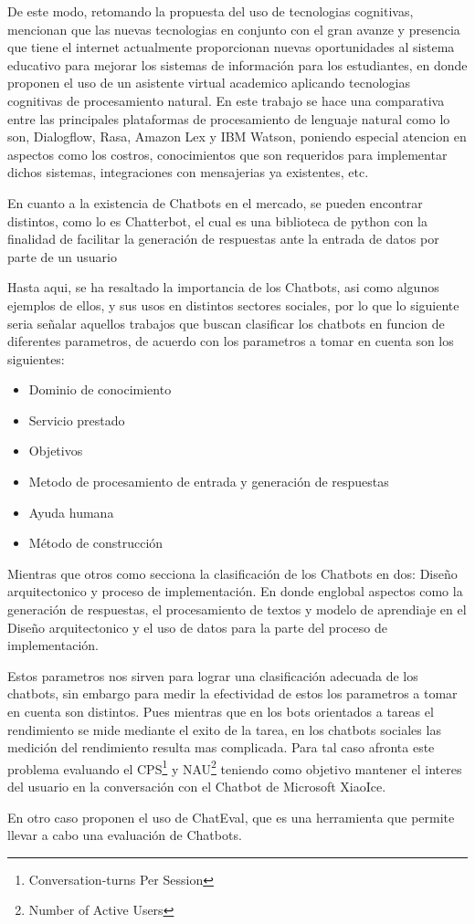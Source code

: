 De este modo, retomando la propuesta del uso de tecnologias cognitivas, \citet{asistVirAcad} mencionan que las nuevas tecnologias en conjunto con el gran avanze y presencia que tiene el internet actualmente proporcionan nuevas oportunidades al sistema educativo para mejorar los sistemas de información para los estudiantes, en donde proponen el uso de un asistente virtual academico aplicando tecnologias cognitivas de procesamiento natural. En este trabajo se hace una comparativa entre las principales plataformas de procesamiento de lenguaje natural como lo son, Dialogflow, Rasa, Amazon Lex y IBM Watson, poniendo especial atencion en aspectos como los costros, conocimientos que son requeridos para implementar dichos sistemas, integraciones con mensajerias ya existentes, etc.

En cuanto a la existencia de Chatbots en el mercado, se pueden encontrar distintos, como lo es Chatterbot, el cual es una biblioteca de python con la finalidad de facilitar la generación de respuestas ante la entrada de datos por parte de un usuario\cite{chatterbot}

Hasta aqui, se ha resaltado la importancia de los Chatbots, asi como algunos ejemplos de ellos, y sus usos en distintos sectores sociales, por lo que lo siguiente seria señalar aquellos trabajos que buscan clasificar los chatbots en funcion de diferentes parametros, de acuerdo con \citet{adamopoulou2020overview} los parametros a tomar en cuenta son los siguientes:

\begin{itemize} 
	\item Dominio de conocimiento
	\item Servicio prestado
	\item Objetivos
	\item Metodo de procesamiento de entrada y generación de respuestas
	\item Ayuda humana
	\item Método de construcción
\end{itemize}

Mientras que otros como \citet{lokman2018modern} secciona la clasificación de los Chatbots en dos: Diseño arquitectonico y proceso de implementación. En donde englobal aspectos como la generación de respuestas, el procesamiento de textos y modelo de aprendiaje en el Diseño arquitectonico y el uso de datos para la parte del proceso de implementación.

Estos parametros nos sirven para lograr una clasificación adecuada de los chatbots, sin embargo para medir la efectividad de estos los parametros a tomar en cuenta son distintos. Pues mientras que en los bots orientados a tareas el rendimiento se mide mediante el exito de la tarea, en los chatbots sociales las medición del rendimiento resulta mas complicada\citep{shawar2007different}. Para tal caso \citet{zhou2020design} afronta este problema evaluando el CPS\footnote{Conversation-turns Per Session} y NAU\footnote{Number of Active Users} teniendo como objetivo mantener el interes del usuario en la conversación con el Chatbot de Microsoft XiaoIce.

En otro caso \citet{sedoc-etal-2019-chateval} proponen el uso de ChatEval, que es una herramienta que permite llevar a cabo una evaluación de Chatbots.


